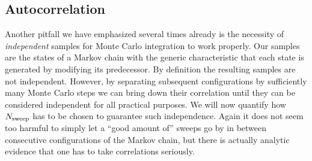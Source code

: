 \subsection{Autocorrelation}

Another pitfall we have emphasized several times already is the necessity of
\emph{independent} samples for Monte Carlo integration to work properly. Our
samples are the states of a Markov chain with the generic characteristic that
each state is generated by modifying its predecessor. By definition the
resulting samples are not independent. However, by separating subsequent
configurations by sufficiently many Monte Carlo steps we can bring down their
correlation until they can be considered independent for all practical purposes.
We will now quantify how~$N_{\mathrm{sweep}}$ has to be chosen to guarantee such
independence.  Again it does not seem too harmful to simply let a ``good amount
of'' sweeps go by in between consecutive configurations of the Markov chain, but
there is actually analytic evidence that one has to take correlations seriously.

